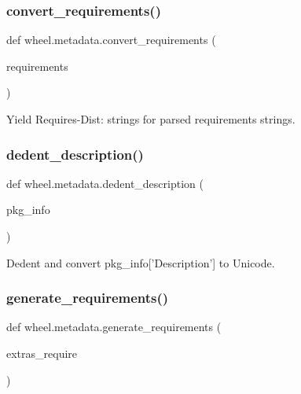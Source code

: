 \subsubsection{\texorpdfstring{convert\+\_\+requirements()}{convert\_requirements()}}
{\footnotesize\ttfamily def wheel.\+metadata.\+convert\+\_\+requirements (\begin{DoxyParamCaption}\item[{}]{requirements }\end{DoxyParamCaption})}

\begin{DoxyVerb}Yield Requires-Dist: strings for parsed requirements strings.\end{DoxyVerb}
 \mbox{\label{namespacewheel_1_1metadata_a695b0aeec77feb2b546d795d2ea755f0}} 
\subsubsection{\texorpdfstring{dedent\+\_\+description()}{dedent\_description()}}
{\footnotesize\ttfamily def wheel.\+metadata.\+dedent\+\_\+description (\begin{DoxyParamCaption}\item[{}]{pkg\+\_\+info }\end{DoxyParamCaption})}

\begin{DoxyVerb}Dedent and convert pkg_info['Description'] to Unicode.
\end{DoxyVerb}
 \mbox{\label{namespacewheel_1_1metadata_a59403b28370dbc99b661a0cfe6ef8928}} 
\subsubsection{\texorpdfstring{generate\+\_\+requirements()}{generate\_requirements()}}
{\footnotesize\ttfamily def wheel.\+metadata.\+generate\+\_\+requirements (\begin{DoxyParamCaption}\item[{}]{extras\+\_\+require }\end{DoxyParamCaption})}


